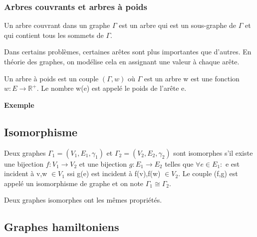
\subsubsection{Arbres couvrants et arbres à poids}

\begin{defn}
Un arbre couvrant dans un graphe $\Gamma$ est un arbre qui est un sous-graphe de $\Gamma$ et qui contient tous les sommets de $\Gamma$.
\end{defn}

Dans certains problèmes, certaines arêtes sont plus importantes que d'autres. En théorie des graphes, on modélise cela en assignant une valeur à chaque arête. 

\begin{defn}
Un arbre à poids est un couple $(\Gamma,w)$ où $\Gamma$ est un arbre w est une fonction $w: E \rightarrow \mathbb{R}^{+}$. Le nombre w(e) est appelé le poids de l'arête e.
\end{defn}

\textbf{Exemple}




\subsection{Isomorphisme}

\begin{defn}
Deux graphes $\Gamma_{1} = (V_{1},E_{1},\gamma_{1})$ et $\Gamma_{2} = (V_{2},E_{2},\gamma_{2})$ sont isomorphes s'il existe une bijection $f: V_{1} \rightarrow V_{2}$ et une bijection $g: E_{1} \rightarrow E_{2}$ telles que $\forall e \in E_{1}:$ e est incident à v,w $\in V_{1}$ ssi g(e) est incident à f(v),f(w) $\in V_{2}$. Le couple (f,g) est appelé un isomorphisme de graphe et on note $\Gamma_{1} \cong \Gamma_{2}$.
\end{defn}

Deux graphes isomorphes ont les mêmes propriétés.

\begin{exmp}
\end{exmp}


\newpage

\subsection{Graphes hamiltoniens}

